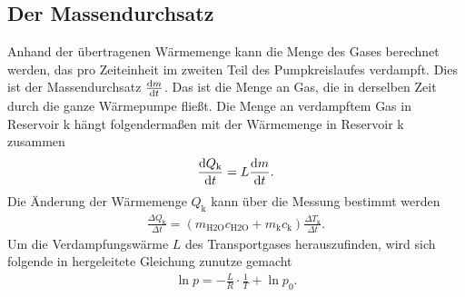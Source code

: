 \subsection{Der Massendurchsatz \cite[vgl.][]{man:v206}}
Anhand der übertragenen Wärmemenge kann  die Menge des Gases berechnet werden, das pro Zeiteinheit
im zweiten Teil des Pumpkreislaufes verdampft.
Dies ist der Massendurchsatz $\frac{\mathop{}\!\mathrm{d} m}{\mathop{}\!\mathrm{d} t}$.
Das ist die Menge an Gas, die in derselben Zeit durch die ganze Wärmepumpe fließt.
Die Menge an verdampftem Gas in Reservoir k hängt folgendermaßen mit der Wärmemenge in Reservoir k zusammen
\begin{align}
    \frac{\mathop{}\!\mathrm{d} Q_\text{k}}{\mathop{}\!\mathrm{d} t} = L \frac{\mathop{}\!\mathrm{d} m}{\mathop{}\!\mathrm{d} t}.
    \label{eq:massedurchsatz}
\end{align} 
Die Änderung der Wärmemenge $ Q_\text{k}$ kann über die Messung bestimmt werden
\begin{align}
    \frac{\Delta Q_\text{k}}{\Delta t} = (m_\text{H2O} c_{\text{H2O}} + m_\text{k} c_\text{k}) \frac{\Delta T_\text{k}}{\Delta t}.
    \label{eq:aenderung_q2}
\end{align} 
Um die Verdampfungswärme $L$ des Transportgases herauszufinden, wird sich folgende in \cite[][5]{man:v203} hergeleitete
Gleichung zunutze gemacht
\begin{align}
    \ln{p} = -\frac{L}{R}\cdot \frac{1}{T} + \ln{p_0}.
    \label{eq:Dampfdruckkurve}
\end{align}